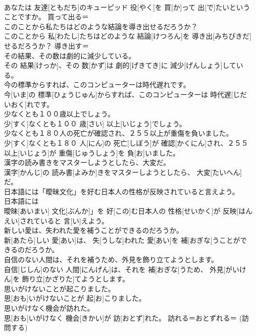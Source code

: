 \documentclass[8pt]{extreport}
\begin{document}
\begin{CJK}{UTF8}{min}
\\	あなたは 友達[ともだち]のキューピッド 役[やく]を 買[か]って 出[で]たいということですか。	買って出る＝ 
\\	このことから私たちはどのような結論を導き出せるだろうか？	
\\	このことから 私[わたし]たちはどのような 結論[けつろん]を 導き出[みちびきだ]せるだろうか？	導き出す＝ 
\\	その結果、その数は劇的に減少している。	
\\	その 結果[けっか]、その 数[かず]は 劇的[げきてき]に 減少[げんしょう]している。	
\\	今の標準からすれば、このコンピューターは時代遅れです。	
\\	今[いま]の 標準[ひょうじゅん]からすれば、このコンピューターは 時代遅[じだいおく]れです。	
\\	少なくとも１００歳以上でしょう。	
\\	少[すく]なくとも１００ 歳[さい] 以上[いじょう]でしょう。	
\\	少なくとも１８０人の死亡が確認され、２５５以上が重傷を負いました。	
\\	少[すく]なくとも１８０ 人[にん]の 死亡[しぼう]が 確認[かくにん]され、２５５ 以上[いじょう]が 重傷[じゅうしょう]を 負[お]いました。	
\\	漢字の読み書きをマスターしようとしたら、大変だ。	
\\	漢字[かんじ]の 読み書[よみか]きをマスターしようとしたら、 大変[たいへん]だ。	
\\	日本語には「曖昧文化」を好む日本人の性格が反映されていると言えよう。	
\\	日本語には
\\	曖昧[あいまい] 文化[ぶんか]」を 好[この]む日本人の 性格[せいかく]が 反映[はんえい]されていると 言[い]えよう。	
\\	新しい愛は、失われた愛を補うことができるのだろうか。	
\\	新[あたら]しい 愛[あい]は、 失[うしな]われた 愛[あい]を 補[おぎな]うことができるのだろうか。	
\\	自信のない人間は、それを補うため、外見を飾り立てようとします。	
\\	自信[じしん]のない 人間[にんげん]は、それを 補[おぎな]うため、 外見[がいけん]を 飾り立[かざりた]てようとします。	
\\	思いがけないことが起こりました。	
\\	思[おも]いがけないことが 起[お]こりました。	
\\	思いがけなく機会が訪れた。	
\\	思[おも]いがけなく 機会[きかい]が 訪[おとず]れた。	訪れる＝おとずれる＝ (訪問する) 

\end{CJK}
\end{document}

